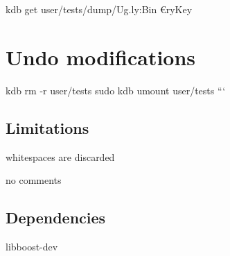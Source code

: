 kdb get user/tests/dump/\+Ug.\+ly\+:Bin{\itshape } €ry\+Key\hypertarget{autotoc_md667_autotoc_md682}{}\section{Undo modifications}\label{autotoc_md667_autotoc_md682}
kdb rm -\/r user/tests sudo kdb umount user/tests ```\hypertarget{autotoc_md667_autotoc_md683}{}\subsection{Limitations}\label{autotoc_md667_autotoc_md683}

\begin{DoxyItemize}
\item whitespaces are discarded
\item no comments
\end{DoxyItemize}\hypertarget{autotoc_md667_autotoc_md684}{}\subsection{Dependencies}\label{autotoc_md667_autotoc_md684}

\begin{DoxyItemize}
\item {\ttfamily libboost-\/dev} 
\end{DoxyItemize}